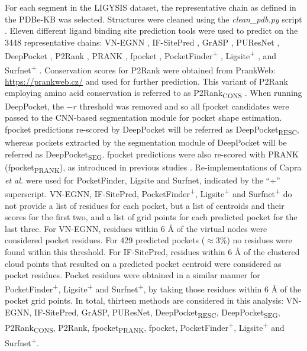 For each segment in the LIGYSIS dataset, the representative chain as defined in the PDBe-KB was selected. Structures were cleaned using the \textit{clean\_pdb.py} script \cite{JUBB_2019_PDBTOOLS}. Eleven different ligand binding site prediction tools were used to predict on the 3448 representative chains: VN-EGNN \cite{SESTAK_2024_VNEGNN}, IF-SitePred \cite{CARBERY_2024_IFSP}, GrASP \cite{SMITH_2024_GrASP}, PUResNet \cite{KANDEL_2021_PURESNET, KANDEL_2024_PURESNET}, DeepPocket \cite{AGGARWAL_2022_DEEPPOCKET}, P2Rank \cite{KRIVAK_2015_P2RANK, KRIVAK_2018_P2RANK}, PRANK \cite{KRIVAK_2015_PRANK}, fpocket \cite{GUILLOUX_2009_FPOCKET, SCHMIDTKE_2010_FPOCKET2}, PocketFinder\textsuperscript{+} \cite{AN_2005_POCKETFINDER}, Ligsite\textsuperscript{+} \cite{HENDLICH_1997_LIGSITE}, and Surfnet\textsuperscript{+} \cite{LASKOWSKI_1995_SURFNET}. Conservation scores for P2Rank were obtained from PrankWeb: \url{https://prankweb.cz/} and used for further prediction. This variant of P2Rank employing amino acid conservation is referred to as P2Rank\textsubscript{CONS} \cite{JENDELE_2019_PRANKWEB, JAKUBEC_2022_PRANKWEB}. When running DeepPocket, the $-r$ threshold was removed and so all fpocket candidates were passed to the CNN-based segmentation module for pocket shape estimation. fpocket predictions re-scored by DeepPocket will be referred as DeepPocket\textsubscript{RESC}, whereas pockets extracted by the segmentation module of DeepPocket will be referred as DeepPocket\textsubscript{SEG}. fpocket predictions were also re-scored with PRANK \cite{KRIVAK_2015_PRANK} (fpocket\textsubscript{PRANK}), as introduced in previous studies \cite{KRIVAK_2015_PRANK, KRIVAK_2015_P2RANK, KRIVAK_2018_P2RANK, COMAJUNCOSA_2024_POCKETS}. Re-implementations of Capra \textit{et al.} \cite{CAPRA_2009_CONCAVITY} were used for PocketFinder, Ligsite and Surfnet, indicated by the ``+'' superscript. VN-EGNN, IF-SitePred, PocketFinder\textsuperscript{+}, Ligsite\textsuperscript{+} and Surfnet\textsuperscript{+} do not provide a list of residues for each pocket, but a list of centroids and their scores for the first two, and a list of grid points for each predicted pocket for the last three. For VN-EGNN, residues within 6 \AA{} of the virtual nodes were considered pocket residues. For 429 predicted pockets ($\approx$3\%) no residues were found within this threshold. For IF-SitePred, residues within 6 \AA{} of the clustered cloud points that resulted on a predicted pocket centroid were considered as pocket residues. Pocket residues were obtained in a similar manner for PocketFinder\textsuperscript{+}, Ligsite\textsuperscript{+} and Surfnet\textsuperscript{+}, by taking those residues within 6 \AA{} of the pocket grid points. In total, thirteen methods are considered in this analysis: VN-EGNN, IF-SitePred, GrASP, PUResNet, DeepPocket\textsubscript{RESC}, DeepPocket\textsubscript{SEG}, P2Rank\textsubscript{CONS}, P2Rank, fpocket\textsubscript{PRANK}, fpocket, PocketFinder\textsuperscript{+}, Ligsite\textsuperscript{+} and Surfnet\textsuperscript{+}.

